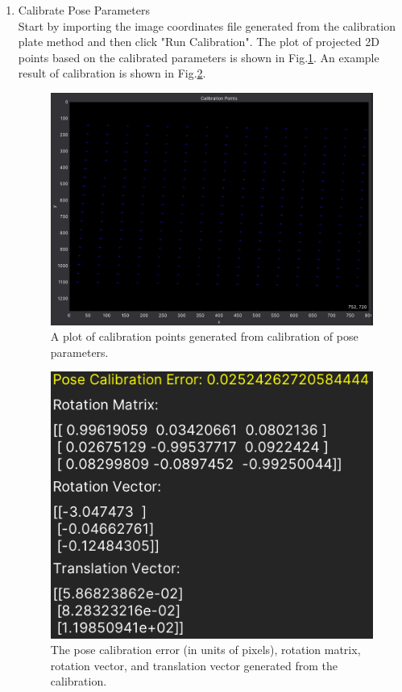 \documentclass[a4paper,fleqn]{article}
\begin{document}
\begin{enumerate}
\begin{enumerate}
        \item Calibrate Pose Parameters\\
        Start by importing the image coordinates file generated from the calibration plate method and then click "Run Calibration". The plot of projected 2D points based on the calibrated parameters is shown in Fig.\ref{fig:GUI_pinhole_posepts}. An example result of calibration is shown in Fig.\ref{fig:GUI_pinhole_posecalib}.
            \begin{figure}[h]
                \centering
                \includegraphics[width=\linewidth]{Fig/GUI_pinhole_posepts.png}
                \caption{A plot of calibration points generated from calibration of pose parameters.}
                \label{fig:GUI_pinhole_posepts}
            \end{figure}
            \begin{figure}[h]
                \centering
                \includegraphics[width=0.8\linewidth]{Fig/GUI_pinhole_posecalib.png}
                \caption{The pose calibration error (in units of pixels), rotation matrix, rotation vector, and translation vector generated from the calibration.}
                \label{fig:GUI_pinhole_posecalib}
            \end{figure}


\end{enumerate}
\end{enumerate}
\end{document}
